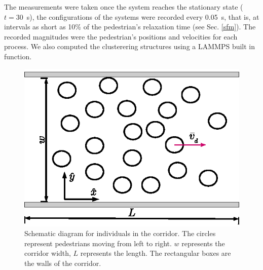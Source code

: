 The measurements were taken once the system reaches the stationary state ($t=30$~s), the configurations of the systems were recorded every 0.05~s, that is, at intervals as short as 10\% of the pedestrian’s relaxation time (see Sec. \ref{sfm}). The recorded magnitudes were the pedestrian’s positions and velocities for each process. We also computed the clusterering structures using a LAMMPS built in function.\\

  



\begin{figure}[htbp!]
\includegraphics[width=\columnwidth]
{./plots/corridor.eps}
\caption{\label{pasillo} Schematic diagram for individuals in the corridor. 
The circles represent pedestrians moving from left to right. $w$ represents the corridor width, $L$ represents the length. The rectangular boxes are the walls of the corridor.  }
\end{figure}
